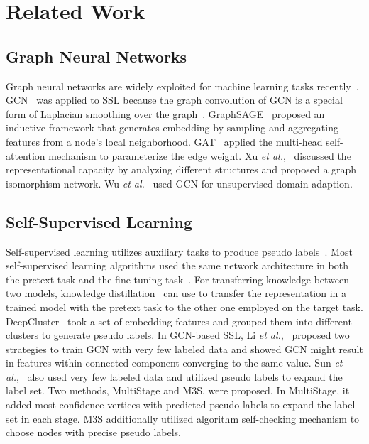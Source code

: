 \documentclass{article}
\begin{document}
\section{Related Work}\label{RW}
\subsection{Graph Neural Networks}
Graph neural networks are widely exploited for machine learning tasks recently~\cite{Wu9046288,ji2020survey,Pan8822591}. GCN~\cite{kipf2016semi} was applied to SSL because the graph convolution of GCN is a special form of Laplacian smoothing over the graph~\cite{li2018deeper}. GraphSAGE~\cite{Hamilton2017} proposed an inductive framework that generates embedding by sampling and aggregating features from a node's local neighborhood. GAT~\cite{velivckovic2017graph} applied the multi-head self-attention mechanism to parameterize the edge weight. Xu {\it et al.},~\cite{xu2018powerful} discussed the representational capacity by analyzing different structures and proposed a graph isomorphism network. Wu {\it et al.}~\cite{wu2020unsupervised} used GCN for unsupervised domain adaption.
\subsection{Self-Supervised Learning}
Self-supervised learning utilizes auxiliary tasks to produce pseudo labels~\cite{doersch2015unsupervised}. Most self-supervised learning algorithms used the same network architecture in both the pretext task and the fine-tuning task~\cite{goyal2019scaling}. For transferring knowledge between two models, knowledge distillation~\cite{bu2006model,hinton2015distilling} can use to transfer the representation in a trained model with the pretext task to the other one employed on the target task. DeepCluster~\cite{caron2018deep} took a set of embedding features and grouped them into different clusters to generate pseudo labels. In GCN-based SSL, Li {\it et al.},~\cite{li2018deeper} proposed two strategies to train GCN with very few labeled data and showed GCN might result in features within connected component converging to the same value. Sun {\it et al.},~\cite{sun2019multi} also used very few labeled data and utilized pseudo labels to expand the label set. Two methods, MultiStage and M3S, were proposed. In MultiStage, it added most confidence vertices with predicted pseudo labels to expand the label set in each stage. M3S additionally utilized algorithm self-checking mechanism to choose nodes with precise pseudo labels.
\end{document}
